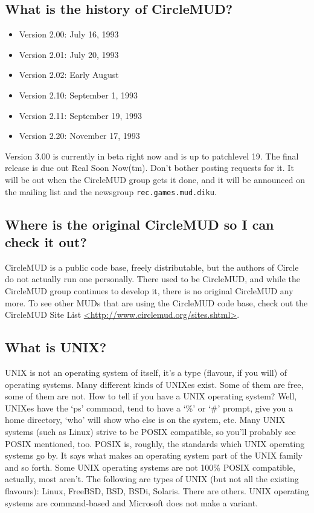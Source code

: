 \documentclass[11pt]{article}
\begin{document}
\subsection{What is the history of CircleMUD?}
\begin{itemize}
\item Version 2.00: July 16, 1993
\item Version 2.01: July 20, 1993
\item Version 2.02: Early August
\item Version 2.10: September 1, 1993
\item Version 2.11: September 19, 1993
\item Version 2.20: November 17, 1993
\end{itemize}
Version 3.00 is currently in beta right now and is up to patchlevel 19. The final release is due out Real Soon Now(tm).  Don't bother posting requests for it.  It will be out when the CircleMUD group gets it done, and it will be announced on the mailing list and the newsgroup \texttt{rec.games.mud.diku}.

\subsection{Where is the original CircleMUD so I can check it out?}
CircleMUD is a public code base, freely distributable, but the authors of Circle do not actually run one personally.  There used to be CircleMUD, and while the CircleMUD group continues to develop it, there is no original CircleMUD any more.  To see other MUDs that are using the CircleMUD code base, check out the CircleMUD Site List \url{<http://www.circlemud.org/sites.shtml>}.

\subsection{What is UNIX?}
UNIX is not an operating system of itself, it's a type (flavour, if you will) of operating systems. Many different kinds of UNIXes exist. Some of them are free, some of them are not. How to tell if you have a UNIX operating system? Well, UNIXes have the `ps' command, tend to have a `\%' or `\#' prompt, give you a home directory, `who' will show who else is on the system, etc. Many UNIX systems (such as Linux) strive to be POSIX compatible, so you'll probably see POSIX mentioned, too. POSIX is, roughly, the standards which UNIX operating systems go by. It says what makes an operating system part of the UNIX family and so forth. Some UNIX operating systems are not 100\% POSIX compatible, actually, most aren't. The following are types of UNIX (but not all the existing flavours): Linux, FreeBSD, BSD, BSDi, Solaris. There are others. UNIX operating systems are command-based and Microsoft does not make a variant.
\end{document}

